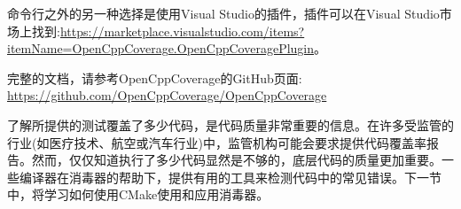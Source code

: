 命令行之外的另一种选择是使用Visual Studio的插件，插件可以在Visual Studio市场上找到:\url{https://marketplace.visualstudio.com/items?itemName=OpenCppCoverage.OpenCppCoveragePlugin}。

完整的文档，请参考OpenCppCoverage的GitHub页面:
\url{https://github.com/OpenCppCoverage/OpenCppCoverage}

了解所提供的测试覆盖了多少代码，是代码质量非常重要的信息。在许多受监管的行业(如医疗技术、航空或汽车行业)中，监管机构可能会要求提供代码覆盖率报告。然而，仅仅知道执行了多少代码显然是不够的，底层代码的质量更加重要。一些编译器在消毒器的帮助下，提供有用的工具来检测代码中的常见错误。下一节中，将学习如何使用CMake使用和应用消毒器。

























